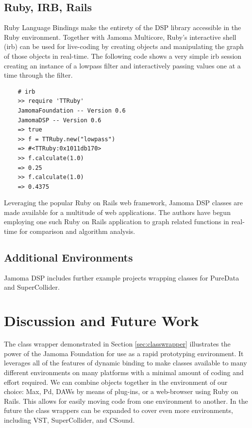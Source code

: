 \documentclass[twoside,10pt]{article}
\begin{document}

\subsection{Ruby, IRB, Rails}
Ruby Language Bindings make the entirety of the DSP library accessible in the Ruby environment.  Together with Jamoma Multicore, Ruby's interactive shell (irb) can be used for live-coding by creating objects and manipulating the graph of those objects in real-time.  The following code shows a very simple irb session creating an instance of a lowpass filter and interactively passing values one at a time through the filter.


\begin{lstlisting}
    # irb
    >> require 'TTRuby'
    JamomaFoundation -- Version 0.6
    JamomaDSP -- Version 0.6
    => true
    >> f = TTRuby.new("lowpass")
    => #<TTRuby:0x1011db170>
    >> f.calculate(1.0)
    => 0.25
    >> f.calculate(1.0)
    => 0.4375
\end{lstlisting}

\noindent Leveraging the popular Ruby on Rails web framework, Jamoma DSP classes are made available for a multitude of web applications.  The authors have begun employing one such Ruby on Rails application to graph related functions in real-time for comparison and algorithm analysis.



\subsection{Additional Environments}

Jamoma DSP includes further example projects wrapping classes for PureData and SuperCollider.




\section{Discussion and Future Work} %

The class wrapper demonstrated in Section \ref{sec:classwrapper} illustrates the power of the Jamoma Foundation for use as a rapid prototyping environment.  It leverages all of the features of dynamic binding to make classes available to many different environments on many platforms with a minimal amount of coding and effort required.  We can combine objects together in the environment of our choice: Max, Pd, DAWs by means of plug-ins, or a web-browser using Ruby on Rails.  This allows for easily moving code from one environment to another.  In the future the class wrappers can be expanded to cover even more environments, including VST, SuperCollider, and CSound.
\end{document}

